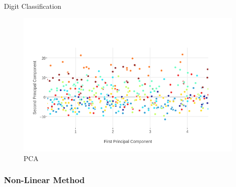 \documentclass{beamer}
\theoremstyle{plain}
\theoremstyle{definition}
\theoremstyle{plain}
\theoremstyle{plain}
\begin{document}
\begin{frame}{Digit Classification}
\begin{figure}[h!]
\begin{center}
\includegraphics[width=\textwidth]{./Figures/pca_dr.png}
\caption {PCA}
\label{pca_dr} 
\end{center}
\end{figure}
\end{frame}
\subsubsection{Non-Linear Method}
\end{document}

